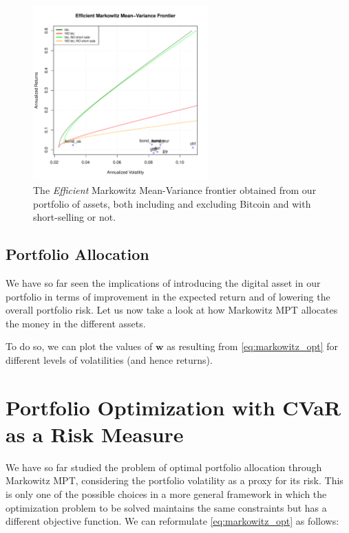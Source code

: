 \begin{figure}
	\centering
	\includegraphics[width=0.6\textwidth]{Images/efficient_frontier.pdf}
	\caption[Markowitz Efficient frontier comparison]{The \textit{Efficient} Markowitz Mean-Variance frontier obtained from our portfolio of assets, both including and excluding Bitcoin and with short-selling or not.}
	\label{fig:efficient_frontier_comparison}
\end{figure}


\subsection{Portfolio Allocation}
We have so far seen the implications of introducing the digital asset in our portfolio in terms of improvement in the expected return and of lowering the overall portfolio risk.
Let us now take a look at how Markowitz MPT allocates the money in the different assets.

To do so, we can plot the values of $\mathbf{w}$ as resulting from \eqref{eq:markowitz_opt} for different levels of volatilities (and hence returns).



\section{Portfolio Optimization with CVaR as a Risk Measure}
\label{sec:cvar_theory}

We have so far studied the problem of optimal portfolio allocation through Markowitz MPT, considering the portfolio volatility as a proxy for its risk.
This is only one of the possible choices in a more general framework in which the optimization problem to be solved maintains the same constraints but has a  different objective function. We can reformulate \eqref{eq:markowitz_opt} as follows:

